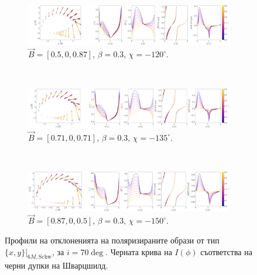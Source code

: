 \begin{figure}[!htb]
	\centering
	\begin{subfigure}{12cm}
		\hspace{-0.5cm}
		\includegraphics[scale = 0.13]{WH_delta_fig_B_0.5_0.87_0_70_deg_r6.png}
		\caption{$\vec{B} = [0.5, 0, 0.87]$, $\beta = 0.3$, $\chi = -120^\circ$.} 
	\end{subfigure}\\
	\begin{subfigure}{12cm}
		\hspace{-0.5cm}
		\includegraphics[scale = 0.13]{WH_delta_fig_B_0.71_0.71_0_70_deg_r6.png}
		\caption{$\vec{B} = [0.71, 0, 0.71]$, $\beta = 0.3$, $\chi = -135^\circ$.}
	\end{subfigure}\\
	\begin{subfigure}{12cm}
		\hspace{-0.5cm}
		\includegraphics[scale = 0.13]{WH_delta_fig_B_0.87_0.5_0_70_deg_r6.png}
		\caption{$\vec{B} = [0.87, 0, 0.5]$, $\beta = 0.3$, $\chi = -150^\circ$.}
	\end{subfigure}
	\caption[Профили на отклоненията на поляризираните образи oт тип $\{x,y\}\vert_{6M, \text{Schw}}$, за $i = 70\deg$.]{\small Профили на отклоненията на поляризираните образи от тип $\{x,y\}\vert_{6M, \text{Schw}}$, за $i = 70\deg$. Черната крива на $I(\phi)$ съответства на черни дупки на Шварцшилд.} 
	\label{WH_delta_r6_70_deg}
\end{figure}


